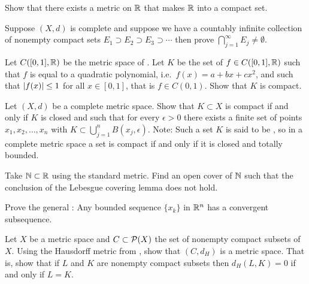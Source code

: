 \begin{exercise}[Challenging]
Show that there exists a metric on ${\mathbb{R}}$ that makes ${\mathbb{R}}$ into a compact set.
\end{exercise}

\begin{exercise}
Suppose $(X,d)$ is complete and suppose we have a countably infinite
collection of nonempty compact sets $E_1 \supset E_2 \supset E_3 \supset
\cdots$ then prove $\bigcap_{j=1}^\infty E_j \not= \emptyset$.
\end{exercise}

\begin{exercise}[Challenging]
Let $C([0,1],{\mathbb{R}})$ be the metric space of .
Let $K$ be the set of $f \in C([0,1],{\mathbb{R}})$ such that
$f$ is equal to a quadratic polynomial, i.e.\ $f(x) = a+bx+cx^2$, and such that
$\left\lvert {f(x)} \right\rvert \leq 1$ for all $x \in [0,1]$,
that is $f \in C(0,1)$.  Show that $K$ is compact.
\end{exercise}

\begin{exercise}[Challenging] \label{exercise:mstotbound}
Let $(X,d)$ be a complete metric space.
Show that $K \subset X$ is compact if and only if $K$ is closed
and such that for every $\epsilon > 0$
there exists a finite set of points $x_1,x_2,\ldots,x_n$ with
$K \subset \bigcup_{j=1}^n B(x_j,\epsilon)$.
Note: Such a set $K$ is said to be \emph{},
so in a complete metric space a set is compact if and only
if it is closed and totally bounded.
\end{exercise}

\begin{exercise}
Take ${\mathbb{N}} \subset {\mathbb{R}}$ using the standard metric.  Find an open cover of ${\mathbb{N}}$
such that the conclusion of the Lebesgue covering lemma does not hold.
\end{exercise}

\begin{exercise}
Prove the general :
Any bounded sequence $\{ x_k
\}$ in ${\mathbb{R}}^n$ has a convergent subsequence.
\end{exercise}

\begin{exercise}
Let $X$ be a metric space and
$C \subset {\mathcal{P}}(X)$ the set of nonempty compact subsets of $X$.
Using the Hausdorff metric from ,
show that $(C,d_H)$ is a metric space.  That is, show that
if $L$ and $K$ are nonempty compact subsets then $d_H(L,K) = 0$
if and only if $L=K$.
\end{exercise}


